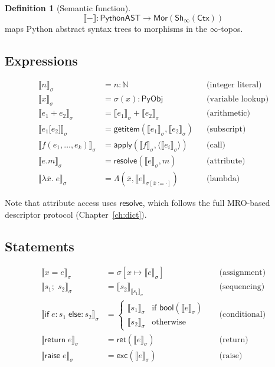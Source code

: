 \documentclass[11pt,a4paper]{report}
\theoremstyle{definition}
\newtheorem{definition}{Definition}[chapter]
\theoremstyle{plain}
\newcommand{\den}[1]{\llbracket #1 \rrbracket}
\newcommand{\Nat}{\mathbb{N}}
\newcommand{\PyObj}{\mathsf{PyObj}}
\newcommand{\Ctx}{\mathsf{Ctx}}
\newcommand{\Sh}{\mathsf{Sh}}
\begin{document}
\begin{definition}[Semantic function]
\[
  \den{-} : \mathsf{PythonAST} \to \mathsf{Mor}(\Sh_\infty(\Ctx))
\]
maps Python abstract syntax trees to morphisms in the $\infty$-topos.
\end{definition}

\subsection{Expressions}

\begin{align}
  \den{n}_\sigma &= n : \Nat
    && \text{(integer literal)} \\
  \den{x}_\sigma &= \sigma(x) : \PyObj
    && \text{(variable lookup)} \\
  \den{e_1 \mathbin{+} e_2}_\sigma &= \den{e_1}_\sigma + \den{e_2}_\sigma
    && \text{(arithmetic)} \\
  \den{e_1\texttt{[}e_2\texttt{]}}_\sigma &= \mathsf{getitem}(\den{e_1}_\sigma, \den{e_2}_\sigma)
    && \text{(subscript)} \\
  \den{f(e_1, \ldots, e_k)}_\sigma &= \mathsf{apply}(\den{f}_\sigma, \langle\den{e_i}_\sigma\rangle)
    && \text{(call)} \\
  \den{e\texttt{.}m}_\sigma &= \mathsf{resolve}(\den{e}_\sigma, m)
    && \text{(attribute)} \\
  \den{\lambda \bar{x}.\; e}_\sigma &= \Lambda(\bar{x}, \den{e}_{\sigma[\bar{x}:=\cdot]})
    && \text{(lambda)}
\end{align}

Note that attribute access uses $\mathsf{resolve}$, which follows the full
MRO-based descriptor protocol (Chapter~\ref{ch:dict}).

\subsection{Statements}

\begin{align}
  \den{x = e}_\sigma &= \sigma[x \mapsto \den{e}_\sigma]
    && \text{(assignment)} \\
  \den{s_1;\; s_2}_\sigma &= \den{s_2}_{\den{s_1}_\sigma}
    && \text{(sequencing)} \\
  \den{\mathsf{if}\;e:s_1\;\mathsf{else}:s_2}_\sigma &=
    \begin{cases}
      \den{s_1}_\sigma & \text{if } \mathsf{bool}(\den{e}_\sigma) \\
      \den{s_2}_\sigma & \text{otherwise}
    \end{cases}
    && \text{(conditional)} \\
  \den{\mathsf{return}\;e}_\sigma &= \mathsf{ret}(\den{e}_\sigma)
    && \text{(return)} \\
  \den{\mathsf{raise}\;e}_\sigma &= \mathsf{exc}(\den{e}_\sigma)
    && \text{(raise)}
\end{align}
\end{document}
